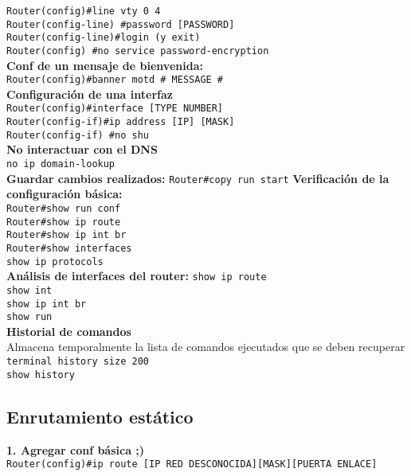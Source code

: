 \documentclass[letterpaper,12pt]{article}
\begin{document}
\begin{sloppypar}
\texttt{Router(config)\#line vty 0 4 \\ Router(config-line) \#password [PASSWORD] \\ Router(config-line)\#login (y exit)}\\
\texttt{Router(config) \#no service password-encryption}
\vspace{0.3cm}\\
\textbf{Conf de un mensaje de bienvenida:} \\ 
\texttt{Router(config)\#banner motd \# MESSAGE \#}
\vspace{0.3cm}\\
\textbf{Configuración de una interfaz} \\
\texttt{Router(config)\#interface [TYPE NUMBER] \\ Router(config-if)\#ip address [IP] [MASK] \\ Router(config-if) \#no shu}
\vspace{0.3cm}\\ 
\textbf{No interactuar con el DNS} \\ 
\texttt{no ip domain-lookup}
\vspace{0.3cm}\\ 
\textbf{Guardar cambios realizados:}
\texttt{Router\#copy run start} 
\newpage
\textbf{Verificación de la configuración básica:}\\
\texttt{Router\#show run conf \\ Router\#show ip route \\ Router\#show ip int br \\ Router\#show interfaces \\ show ip protocols}
\vspace{0.3cm}\\ 
\textbf{Análisis de interfaces del router:}
\texttt{show ip route \\ show int \\ show ip int br \\ show run}
\vspace{0.3cm}\\ 
\textbf{Historial de comandos} \\ 
Almacena temporalmente la lista de comandos ejecutados que se deben recuperar \\ 
\texttt{terminal history size 200 \\ show history}


\subsection{Enrutamiento estático}
\textbf{1. Agregar conf básica ;)}\\
\texttt{Router(config)\#ip route [IP RED DESCONOCIDA][MASK][PUERTA ENLACE]}

\end{sloppypar}
\end{document}
